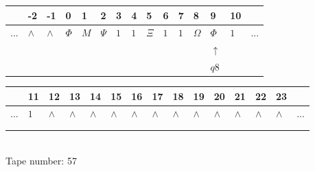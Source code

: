 \documentclass[11pt]{article}
\begin{document}
\begin{table}[H]
\centering
\begin{tabular}{lllllllllllllll}
 & -2 & -1 & 0 & 1 & 2 & 3 & 4 & 5 & 6 & 7 & 8 & 9 & 10 & \\
\hline
$...$ & \multicolumn{1}{|l|}{$\wedge$} & \multicolumn{1}{|l|}{$\wedge$} & \multicolumn{1}{|l|}{$\Phi$} & \multicolumn{1}{|l|}{$M$} & \multicolumn{1}{|l|}{$\Psi$} & \multicolumn{1}{|l|}{$1$} & \multicolumn{1}{|l|}{$1$} & \multicolumn{1}{|l|}{$\Xi$} & \multicolumn{1}{|l|}{$1$} & \multicolumn{1}{|l|}{$1$} & \multicolumn{1}{|l|}{$\Omega$} & \multicolumn{1}{|l|}{$\Phi$} & \multicolumn{1}{|l|}{$1$} & $...$\\
\hline
&  &  &  &  &  &  &  &  &  &  &  & $\uparrow$ &  &  \\
&  &  &  &  &  &  &  &  &  &  &  & $ q8 $ &  &  \\
\end{tabular}
\begin{tabular}{lllllllllllllll}
 & 11 & 12 & 13 & 14 & 15 & 16 & 17 & 18 & 19 & 20 & 21 & 22 & 23 & \\
\hline
$...$ & \multicolumn{1}{|l|}{$1$} & \multicolumn{1}{|l|}{$\wedge$} & \multicolumn{1}{|l|}{$\wedge$} & \multicolumn{1}{|l|}{$\wedge$} & \multicolumn{1}{|l|}{$\wedge$} & \multicolumn{1}{|l|}{$\wedge$} & \multicolumn{1}{|l|}{$\wedge$} & \multicolumn{1}{|l|}{$\wedge$} & \multicolumn{1}{|l|}{$\wedge$} & \multicolumn{1}{|l|}{$\wedge$} & \multicolumn{1}{|l|}{$\wedge$} & \multicolumn{1}{|l|}{$\wedge$} & \multicolumn{1}{|l|}{$\wedge$} & $...$\\
\hline
&  &  &  &  &  &  &  &  &  &  &  &  &  &  \\
&  &  &  &  &  &  &  &  &  &  &  &  &  &  \\
\end{tabular}
\\
Tape number: 57
\noindent\makebox[\linewidth]{\hdashrule{\textwidth}{1pt}{1pt}}\end{table}
\end{document}
